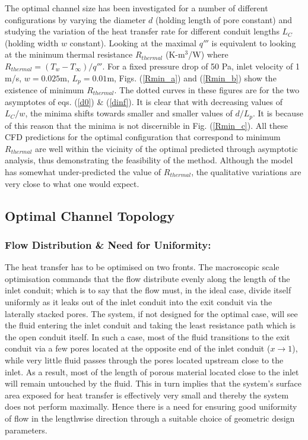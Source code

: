 \documentclass[twocolumn,10pt,cleanfoot]{ihmtc}
\begin{document}
%
%
The optimal channel size has been investigated for a number of different configurations by varying the diameter $ d $ (holding length of pore constant) and studying the variation of the heat transfer rate for different conduit lengths $L_C$ (holding width $w$ constant). Looking at the maximal $ q''' $ is equivalent to looking at the minimum thermal resistance $ R_{thermal} $ (K-m$^3$/W) where $ R_{thermal}=(T_w-T_{\infty})/q''' $. For a fixed pressure drop of 50 Pa, inlet velocity of 1 m/s, $w=0.025$m, $L_p=0.01$m, Figs. (\ref{Rmin_a}) and (\ref{Rmin_b}) show the existence of minimum $R_{thermal}$. The dotted curves in these figures are for the two asymptotes of eqs. (\ref{d0}) \& (\ref{dinf}). It is clear that with decreasing values of $L_C/w$, the minima shifts towards smaller and smaller values of $d/L_p$. It is because of this reason that the minima is not discernible in Fig. (\ref{Rmin_c}). All these CFD predictions for the optimal configuration that correspond to minimum $R_{thermal}$ are well within the vicinity of the optimal predicted through asymptotic analysis, thus demonstrating the feasibility of the method.  Although the model has somewhat under-predicted the value of $R_{thermal}$, the qualitative variations are very close to what one would expect.
%
\subsection{Optimal Channel Topology}\label{choiceofdesign}
\subsubsection*{Flow Distribution \& Need for Uniformity:} The heat transfer has to be optimised on two fronts. The macroscopic scale optimisation commands that the flow distribute evenly along the length of the inlet conduit; which is to say that the flow must, in the ideal case, divide itself uniformly as it leaks out of the inlet conduit into the exit conduit via the laterally stacked pores. The system, if not designed for the optimal case, will see the fluid entering the inlet conduit and taking the least resistance path which is the open conduit itself. In such a case, most of the fluid transitions to the exit conduit via a few pores located at the opposite end of the inlet conduit ($x \rightarrow 1$), while very little fluid passes through the pores located upstream close to the inlet. As a result, most of the length of porous material located close to the inlet will remain untouched by the fluid. This in turn implies that the system's surface area exposed for heat transfer is effectively very small and thereby the system does not perform maximally. Hence there is a need for ensuring good uniformity of flow in the lengthwise direction through a suitable choice of geometric design parameters.
%
\end{document}
